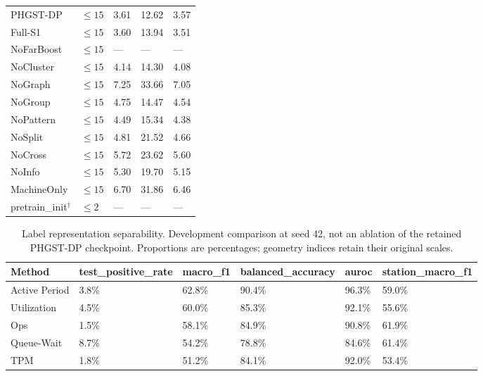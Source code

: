 \begin{table}[p]
\begin{tabularx}{\textwidth}{@{}lXXXX@{}}
\midrule
PHGST-DP & $\le 15$ & 3.61 & 12.62 & 3.57 \\
Full-S1 & $\le 15$ & 3.60 & 13.94 & 3.51 \\
NoFarBoost & $\le 15$ & --- & --- & --- \\
NoCluster & $\le 15$ & 4.14 & 14.30 & 4.08 \\
NoGraph & $\le 15$ & 7.25 & 33.66 & 7.05 \\
NoGroup & $\le 15$ & 4.75 & 14.47 & 4.54 \\
NoPattern & $\le 15$ & 4.49 & 15.34 & 4.38 \\
NoSplit & $\le 15$ & 4.81 & 21.52 & 4.66 \\
NoCross & $\le 15$ & 5.72 & 23.62 & 5.60 \\
NoInfo & $\le 15$ & 5.30 & 19.70 & 5.15 \\
MachineOnly & $\le 15$ & 6.70 & 31.86 & 6.46 \\
\midrule
pretrain\_init$^\dagger$ & $\le 2$ & --- & --- & --- \\
\bottomrule
\end{tabularx}
\end{table}

\begin{table}[p]
\centering\scriptsize
\caption{Label representation separability. Development comparison at seed 42, not an ablation of the retained PHGST-DP checkpoint. Proportions are percentages; geometry indices retain their original scales.}
\begin{tabularx}{\textwidth}{lXXXXX}
\toprule
Method & test\_positive\_rate & macro\_f1 & balanced\_accuracy & auroc & station\_macro\_f1 \\
\midrule
Active Period & 3.8\% & 62.8\% & 90.4\% & 96.3\% & 59.0\% \\
Utilization & 4.5\% & 60.0\% & 85.3\% & 92.1\% & 55.6\% \\
Ops & 1.5\% & 58.1\% & 84.9\% & 90.8\% & 61.9\% \\
Queue-Wait & 8.7\% & 54.2\% & 78.8\% & 84.6\% & 61.4\% \\
TPM & 1.8\% & 51.2\% & 84.1\% & 92.0\% & 53.4\% \\
\bottomrule
\end{tabularx}
\end{table}

